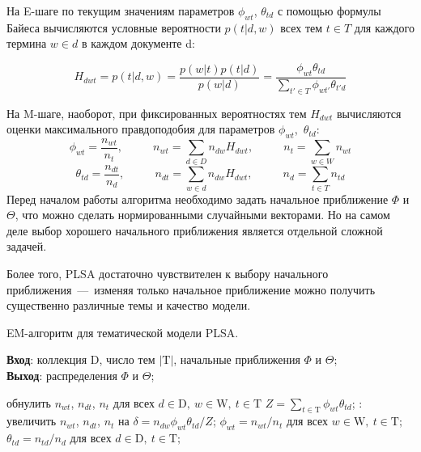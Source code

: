 \documentclass[a4paper, 14pt]{extarticle}
\begin{document}
   	На E-шаге по текущим значениям параметров $\phi_{wt}$, $\theta_{td}$ с помощью формулы Байеса вычисляются условные вероятности $p(t| d, w)$ всех тем $t \in T$ для каждого термина $w \in d$ в каждом документе d:
   	
   	\begin{equation}
   	H_{dwt} = p(t|d, w) = \frac{p(w|t)p(t|d)}{p(w|d)} = \frac{\phi_{wt} \theta_{td}}{\sum_{t' \in T}\phi_{wt'}\theta_{t'd}}
   	\end{equation}
   	
   	На M-шаге, наоборот, при фиксированных вероятностях тем $H_{dwt}$ вычисляются оценки максимального правдоподобия для параметров $\phi_{wt}$,~$\theta_{td}$:
   	\begin{equation}\phi_{wt} = \frac{n_{wt}}{n_t},~~~~~~~~~~~~n_{wt} = \sum_{d \in D} n_{dw}H_{dwt},~~~~~~~~~~~~n_t = \sum_{w \in W} n_{wt}\end{equation}
   	\begin{equation}\theta_{td} = \frac{n_{dt}}{n_d},~~~~~~~~~~~~n_{dt} = \sum_{w \in d} n_{dw}H_{dwt},~~~~~~~~~~~~n_d = \sum_{t \in T} n_{td}\end{equation}
   	Перед началом работы алгоритма необходимо задать начальное приближение $\Phi$ и $\Theta$, что можно сделать нормированными случайными векторами. Но на самом деле выбор хорошего начального приближения является отдельной сложной задачей. 
   	
   	Более того, PLSA достаточно чувствителен к выбору начального приближения~---~изменяя только начальное приближение можно получить существенно различные темы и качество модели.
   
   	\begin{singlespacing}
   		\begin{algorithm}
   		\caption{EM-алгоритм для тематической модели PLSA.}
   		\label{plsa}
   			\textbf{Вход}: коллекция $\textrm{D}$, число тем $|\textrm{T}|$, начальные приближения $\Phi$ и $\Theta$; \\
   			\textbf{Выход}: распределения $\Phi$ и $\Theta$; 
   		\begin{algorithmic}[1]
   			\Repeat
   				\State обнулить $n_{wt}$, $n_{dt}$, $n_{t}$ для всех $d \in \mathrm{D},~w \in \mathrm{W},~t \in \mathrm{T}$
   					\State $Z = \sum_{t \in \mathrm{T}} \phi_{wt} \theta_{td}$;
   					:
   					\State увеличить $n_{wt}$, $n_{dt}$, $n_t$ на $\delta = n_{dw} \phi_{wt}\theta_{td}/Z$;
   					\EndFor
   				\EndFor
   				\State $\phi_{wt} = n_{wt}/n_t$ для всех $w \in \mathrm{W},~t \in \mathrm{T};$
				\State $\theta_{td} = n_{td}/n_d$ для всех $d \in \mathrm{D},~t \in  \mathrm{T};$
   		\end{algorithmic}
   		\end{algorithm}
   	\end{singlespacing}
   	
\end{document}
